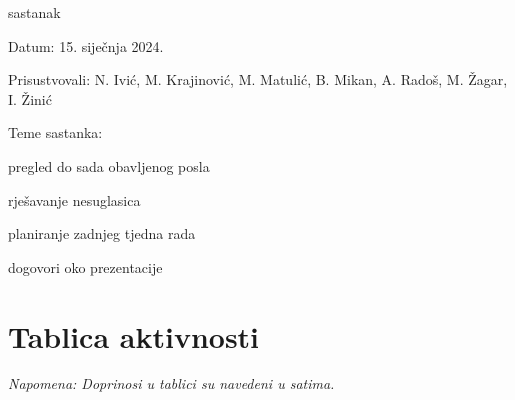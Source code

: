 \begin{packed_enum}
			\item  sastanak
			\item[] \begin{packed_item}
				\item Datum: 15. siječnja 2024.
				\item Prisustvovali: N. Ivić, M. Krajinović, M. Matulić, B. Mikan, A. Radoš, M. Žagar, I. Žinić
				\item Teme sastanka:
				\begin{packed_item}
					\item  pregled do sada obavljenog posla
					\item  rješavanje nesuglasica
					\item  planiranje zadnjeg tjedna rada
					\item  dogovori oko prezentacije
				\end{packed_item}
			\end{packed_item}
			
			
		\end{packed_enum}
		
		\eject
		\section*{Tablica aktivnosti}
		
			
			 \textit{Napomena: Doprinosi u tablici su navedeni u satima.}


